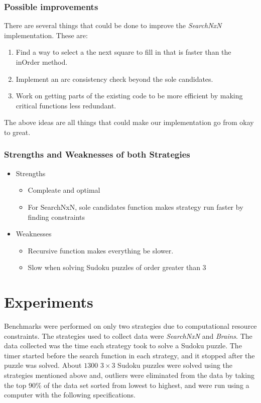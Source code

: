 \documentclass[letterpaper]{article}
\begin{document}
\subsubsection{Possible improvements}
There are several things that could be done to improve the \emph{SearchNxN} implementation. These are:
\begin{enumerate}
\item Find a way to select a the next square to fill in that is faster than the inOrder method.
\item Implement an arc consistency check beyond the sole candidates.
\item Work on getting parts of the existing code to be more efficient by making critical functions less redundant. 
\end{enumerate}
The above ideas are all things that could make our implementation go from okay to great.

\subsubsection{Strengths and Weaknesses of both Strategies}

\begin{itemize}
  \item Strengths
	\begin{itemize}
	  \item Compleate and optimal
	  \item For SearchNxN, sole candidates function makes strategy run faster by finding constraints
	\end{itemize}
  \item Weaknesses
	\begin{itemize}
	  \item Recursive function makes everything be slower.
		\item Slow when solving Sudoku puzzles of order greater than 3 
	\end{itemize}

\end{itemize}

\section{Experiments}
Benchmarks were performed on only two strategies due to computational resource constraints. The strategies used to collect data were \emph{SearchNxN} and \emph{Brains}. The data collected was the time each strategy took to solve a Sudoku puzzle. The timer started before the search function in each strategy, and it stopped after the puzzle was solved. About $1300$ $3 \times 3$ Sudoku puzzles were solved using the strategies mentioned above and, outliers were eliminated from the data by taking the top 90\% of the data set sorted from lowest to highest, and were run using a computer with the following specifications.\\
\end{document}
